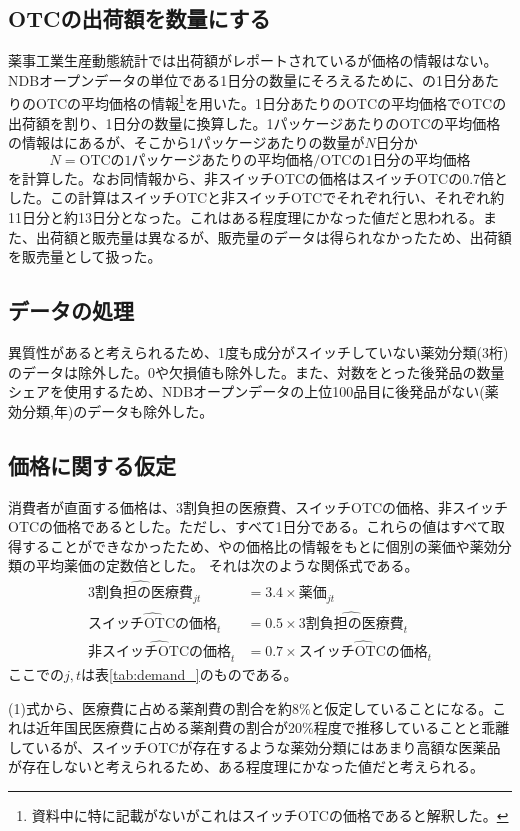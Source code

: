 \documentclass[a4paper,11pt,uplatex]{jsarticle}
\theoremstyle{definition}
\begin{document}
\subsection{OTCの出荷額を数量にする}
薬事工業生産動態統計では出荷額がレポートされているが価格の情報はない。NDBオープンデータの単位である1日分の数量にそろえるために、\cite{igarashi2021}の1日分あたりのOTCの平均価格の情報\footnote{資料中に特に記載がないがこれはスイッチOTCの価格であると解釈した。}を用いた。1日分あたりのOTCの平均価格でOTCの出荷額を割り、1日分の数量に換算した。1パッケージあたりのOTCの平均価格の情報は\cite{iseikyoku2021}にあるが、そこから1パッケージあたりの数量が\(N\)日分か
\[N= \textrm{OTCの1パッケージあたりの平均価格}/\textrm{OTCの1日分の平均価格}\]
を計算した。なお同情報から、非スイッチOTCの価格はスイッチOTCの0.7倍とした。この計算はスイッチOTCと非スイッチOTCでそれぞれ行い、それぞれ約11日分と約13日分となった。これはある程度理にかなった値だと思われる。また、出荷額と販売量は異なるが、販売量のデータは得られなかったため、出荷額を販売量として扱った。
\subsection{データの処理}\label{sec:data_process}
異質性があると考えられるため、1度も成分がスイッチしていない薬効分類(3桁)のデータは除外した。0や欠損値も除外した。また、対数をとった後発品の数量シェアを使用するため、NDBオープンデータの上位100品目に後発品がない(薬効分類,年)のデータも除外した。
\subsection{価格に関する仮定}
消費者が直面する価格は、3割負担の医療費、スイッチOTCの価格、非スイッチOTCの価格であるとした。ただし、すべて1日分である。これらの値はすべて取得することができなかったため、\cite{igarashi2021,igarashi2022}や\cite{iseikyoku2021}の価格比の情報をもとに個別の薬価や薬効分類の平均薬価の定数倍とした。 それは次のような関係式である。
\begin{align}
    \widehat {3割負担の医療費}_{jt}&=3.4\times 薬価_{jt}\\
    \widehat {\textrm{スイッチOTCの価格}}_t&=0.5 \times \widehat{\textrm{3割負担の医療費}}_t\\
    \widehat {\textrm{非スイッチOTCの価格}}_t&=0.7 \times \widehat {\textrm{スイッチOTCの価格}}_t
\end{align}
ここでの\(j,t\)は表\ref{tab:demand_}のものである。

(1)式から、医療費に占める薬剤費の割合を約8\%と仮定していることになる。これは近年国民医療費に占める薬剤費の割合が20\%程度で推移していることと乖離しているが、スイッチOTCが存在するような薬効分類にはあまり高額な医薬品が存在しないと考えられるため、ある程度理にかなった値だと考えられる。
\end{document}
